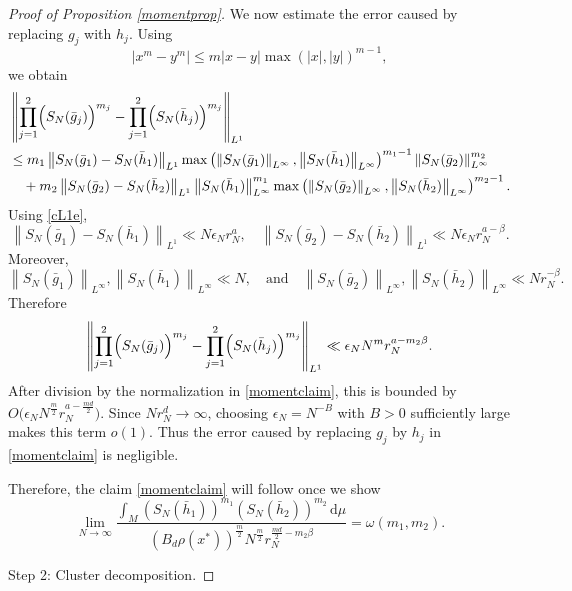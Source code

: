 \documentclass[11pt,twoside,a4paper,reqno]{amsart}
\renewcommand{\d}{\, \text{d}}
\begin{document}
\begin{proof}[Proof of Proposition \ref{momentprop}]
We now estimate the error caused by replacing $g_j$ with $h_j$. Using
$$|x^m-y^m|\le m|x-y|\max(|x|,|y|)^{m-1}, $$
we obtain
\begin{equation*}
\begin{aligned}
&\left\|\prod_{j=1}^2 \Bigl(S_N(\bar g_j)\Bigr)^{m_j}-\prod_{j=1}^2 \Bigl(S_N(\bar h_j)\Bigr)^{m_j}\right\|_{L^1}\\
&\le m_1\left\|S_N(\bar g_1)-S_N(\bar h_1)\right\|_{L^1}\max\left(\left\|S_N(\bar g_1)\right\|_{L^\infty},
\left\|S_N(\bar h_1)\right\|_{L^\infty}\right)^{m_1-1}\left\|S_N(\bar g_2)\right\|_{L^\infty}^{m_2} \\
&\quad+m_2\left\|S_N(\bar g_2)-S_N(\bar h_2)\right\|_{L^1}\left\|S_N(\bar h_1)\right\|_{L^\infty}^{m_1}
\max\left(\left\|S_N(\bar g_2)\right\|_{L^\infty},\left\|S_N(\bar h_2)\right\|_{L^\infty}\right)^{m_2-1}.
\end{aligned}
\end{equation*}
Using \eqref{cL1e},
$$\left\|S_N(\bar g_1)-S_N(\bar h_1)\right\|_{L^1}\ll N\epsilon_N r_N^a,\quad
\left\|S_N(\bar g_2)-S_N(\bar h_2)\right\|_{L^1}\ll N\epsilon_N r_N^{a-\beta}.$$
Moreover,
$$\left\|S_N(\bar g_1)\right\|_{L^\infty},\left\|S_N(\bar h_1)\right\|_{L^\infty}\ll N,
\quad\text{and}\quad
\left\|S_N(\bar g_2)\right\|_{L^\infty},\left\|S_N(\bar h_2)\right\|_{L^\infty}\ll Nr_N^{-\beta}.$$
Therefore
$$\left\|\prod_{j=1}^2 \Bigl(S_N(\bar g_j)\Bigr)^{m_j}-\prod_{j=1}^2 \Bigl(S_N(\bar h_j)\Bigr)^{m_j}\right\|_{L^1}\ll \epsilon_N N^m r_N^{a-m_2\beta}.
$$
After division by the normalization in \eqref{momentclaim}, this is bounded by
$O\bigl(\epsilon_N N^{\frac{m}{2}}r_N^{a-\frac{md}{2}}\bigr).$
Since $Nr_N^d\to\infty$, choosing $\epsilon_N=N^{-B}$ with $B>0$ sufficiently large makes this term $o(1)$. Thus the error caused by replacing  $g_j$ by $h_j$ in \eqref{momentclaim} is negligible.




Therefore, the claim \eqref{momentclaim} will follow once we show
\begin{equation}\label{hbarerr}
\lim_{N\rightarrow\infty} \frac{\int_M \left(S_N(\bar{h}_1) \right)^{m_1} \left(S_N(\bar{h}_2)\right)^{m_2}\d\mu}{\left(B_d \rho(x^*)\right)^{\frac{m}{2}} N^{\frac{m}{2}} r_N^{\frac{md}{2}-m_2\beta }}=\omega(m_1,m_2).
\end{equation}


Step 2: Cluster decomposition.


\end{proof}
\end{document}
